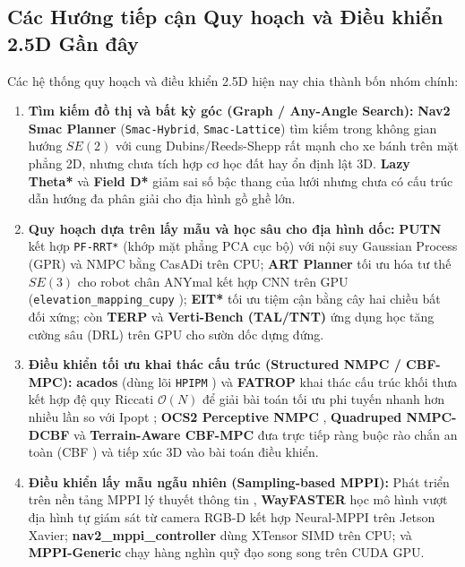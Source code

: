 \documentclass[12pt, a4paper]{article}
\begin{document}
\subsection{Các Hướng tiếp cận Quy hoạch và Điều khiển 2.5D Gần đây}
Các hệ thống quy hoạch và điều khiển 2.5D hiện nay chia thành bốn nhóm chính:
\begin{enumerate}
    \item \textbf{Tìm kiếm đồ thị và bất kỳ góc (Graph / Any-Angle Search):} \textbf{Nav2 Smac Planner} (\texttt{Smac-Hybrid}, \texttt{Smac-Lattice}) \cite{macenski2024smac} tìm kiếm trong không gian hướng $SE(2)$ với cung Dubins/Reeds-Shepp rất mạnh cho xe bánh trên mặt phẳng 2D, nhưng chưa tích hợp cơ học đất hay ổn định lật 3D. \textbf{Lazy Theta*} \cite{nash2010lazytheta} và \textbf{Field D*} \cite{ferguson2006fieldd} giảm sai số bậc thang của lưới nhưng chưa có cấu trúc dẫn hướng đa phân giải cho địa hình gồ ghề lớn.
    \item \textbf{Quy hoạch dựa trên lấy mẫu và học sâu cho địa hình dốc:} \textbf{PUTN} \cite{jian2022putn} kết hợp \texttt{PF-RRT*} (khớp mặt phẳng PCA cục bộ) với nội suy Gaussian Process (GPR) và NMPC bằng CasADi \cite{andersson2019} trên CPU; \textbf{ART Planner} \cite{wellhausen2023art} tối ưu hóa tư thế $SE(3)$ cho robot chân ANYmal kết hợp CNN trên GPU (\texttt{elevation\_mapping\_cupy} \cite{miki2022elevation}); \textbf{EIT*} \cite{strub2022eit} tối ưu tiệm cận bằng cây hai chiều bất đối xứng; còn \textbf{TERP} \cite{weerakoon2022terp} và \textbf{Verti-Bench (TAL/TNT)} \cite{vertibench2025} ứng dụng học tăng cường sâu (DRL) trên GPU cho sườn dốc dựng đứng.
    \item \textbf{Điều khiển tối ưu khai thác cấu trúc (Structured NMPC / CBF-MPC):} \textbf{acados} \cite{verschueren2022} (dùng lõi \texttt{HPIPM} \cite{frison2020hpipm}) và \textbf{FATROP} \cite{vanroye2023fatrop} khai thác cấu trúc khối thưa kết hợp đệ quy Riccati $\mathcal{O}(N)$ \cite{rao1998riccati} để giải bài toán tối ưu phi tuyến nhanh hơn nhiều lần so với Ipopt \cite{wachter2006}; \textbf{OCS2 Perceptive NMPC} \cite{grandia2023}, \textbf{Quadruped NMPC-DCBF} \cite{liao2023dcbf} và \textbf{Terrain-Aware CBF-MPC} \cite{yang2026terraincbf} đưa trực tiếp ràng buộc rào chắn an toàn (CBF \cite{ames2019cbf}) và tiếp xúc 3D vào bài toán điều khiển.
    \item \textbf{Điều khiển lấy mẫu ngẫu nhiên (Sampling-based MPPI):} Phát triển trên nền tảng MPPI lý thuyết thông tin \cite{williams2018mppi}, \textbf{WayFASTER} \cite{gasparino2024wayfaster} học mô hình vượt địa hình tự giám sát từ camera RGB-D kết hợp Neural-MPPI trên Jetson Xavier; \textbf{nav2\_mppi\_controller} dùng XTensor SIMD trên CPU; và \textbf{MPPI-Generic} \cite{vlahov2024mppi} chạy hàng nghìn quỹ đạo song song trên CUDA GPU.
\end{enumerate}
\end{document}
